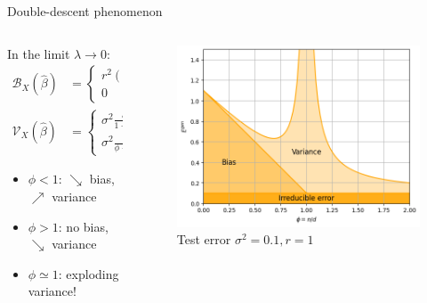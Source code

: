\documentclass[10pt]{beamer}
\begin{document}
\begin{frame}{Double-descent phenomenon}
  \begin{columns}
    \begin{column}{0.5\textwidth}
      \vspace*{0.1cm}

      In the limit $\lambda \to 0$:
      \begin{align*}
        \mathcal B_X(\hat \beta) & = \begin{cases} r^2 (1-\phi)  & \text{if } \phi < 1\\
        0 & \text{if } \phi > 1
        \end{cases}\\
        \mathcal V_X(\hat \beta) & = \begin{cases} \sigma^2 \frac{\phi}{1-\phi} & \text{if } \phi < 1\\
        \sigma^2 \frac{1}{\phi - 1} & \text{if } \phi > 1
        \end{cases}
      \end{align*}
      \begin{itemize}
        \item $\phi<1$: $\searrow$ bias,  $\nearrow$ variance
        \item $\phi>1$: no bias, $\searrow$ variance
        \item $\phi \simeq 1$: exploding variance!
      \end{itemize}
    \end{column}
    \begin{column}{0.5\textwidth}
      \begin{figure}
        \centering
        \includegraphics[width=\textwidth]{images/bias-variance.white.png}
        \caption{Test error $\sigma^2 = 0.1, r=1$}
      \end{figure}
    \end{column}
  \end{columns}


\end{frame}
\end{document}

